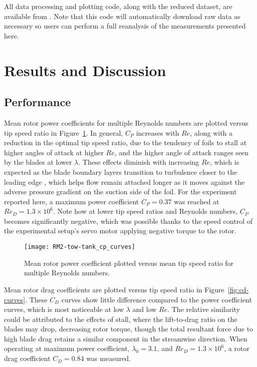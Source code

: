 All data processing and plotting code, along with the reduced dataset, are
available from \cite{Bachant2016-RM2-data}. Note that this code will
automatically download raw data as necessary so users can perform a full
reanalysis of the measurements presented here.


\section{Results and Discussion}

\subsection{Performance}

Mean rotor power coefficients for multiple Reynolds numbers are plotted versus
tip speed ratio in Figure~\ref{fig:cp-curves}. In general, $C_P$ increases with
$Re$, along with a reduction in the optimal tip speed ratio, due to the tendency
of foils to stall at higher angles of attack at higher $Re$, and the higher
angle of attack ranges seen by the blades at lower $\lambda$. These effects
diminish with increasing $Re$, which is expected as the blade boundary layers
transition to turbulence closer to the leading edge \cite{Lissaman1983,
    McMasters1980, Bachant2016-RVAT-Re-dep}, which helps flow remain attached longer
as it moves against the adverse pressure gradient on the suction side of the
foil. For the experiment reported here, a maximum power coefficient $C_P=0.37$
was reached at $Re_D=1.3 \times 10^6$. Note how at lower tip speed ratios and
Reynolds numbers, $C_P$ becomes significantly negative, which was possible
thanks to the speed control of the experimental setup's servo motor applying
negative torque to the rotor.

\begin{figure}
    \centering

    \texttt{[image: RM2-tow-tank\_cp\_curves]}
    
    \caption{Mean rotor power coefficient plotted versus mean tip speed ratio
        for multiple Reynolds numbers.}
    
    \label{fig:cp-curves}
\end{figure}

Mean rotor drag coefficients are plotted versus tip speed ratio in
Figure~\ref{fig:cd-curves}. These $C_D$ curves show little difference compared to
the power coefficient curves, which is most noticeable at low $\lambda$ and low
$Re$. The relative similarity could be attributed to the effects of stall, where
the lift-to-drag ratio on the blades may drop, decreasing rotor torque, though
the total resultant force due to high blade drag retains a similar component in
the streamwise direction. When operating at maximum power coefficient,
$\lambda_0=3.1$, and $Re_D=1.3 \times 10^6$, a rotor drag coefficient $C_D=0.84$
was measured.

